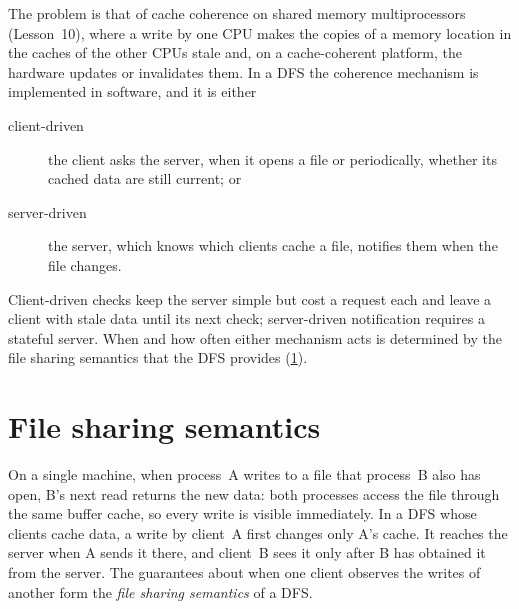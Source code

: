 \documentclass[../main.tex]{subfiles}
\begin{document}
The problem is that of cache coherence on shared
memory multiprocessors (Lesson~10), where a write by one CPU makes the
copies of a memory location in the caches of the other CPUs stale and, on
a cache-coherent platform, the hardware updates or invalidates them.  In a
DFS the coherence mechanism is implemented in software, and it is either
\begin{description}
  \item[client-driven] the client asks the server, when it opens a file or
    periodically, whether its cached data are still current; or
  \item[server-driven] the server, which knows which clients cache a file,
    notifies them when the file changes.
\end{description}
Client-driven checks keep the server simple but cost a request each and
leave a client with stale data until its next check; server-driven
notification requires a stateful server.  When and how often either
mechanism acts is determined by the file sharing semantics that the DFS
provides (\cref{sec:l14-semantics}).

\section{File sharing semantics}
\label{sec:l14-semantics}

On a single machine, when process~A writes to a file that process~B also
has open, B's next read returns the new data: both processes access the
file through the same buffer cache, so every write is visible
immediately.  In a DFS whose clients cache data, a write by
client~A first changes only A's cache.  It reaches the server when A sends
it there, and client~B sees it only after B has obtained it from the
server.  The guarantees about when one client observes the writes of
another form the \emph{file sharing semantics} of a DFS.
\end{document}
